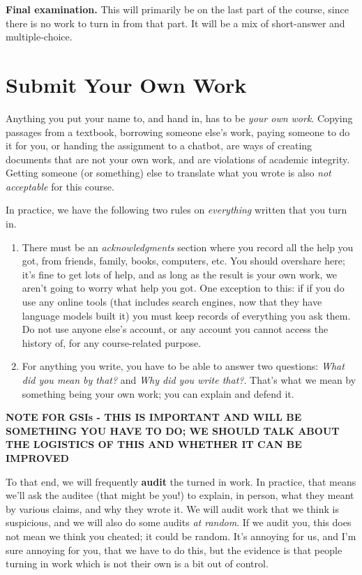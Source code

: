 \documentclass[
  letterpaper,
  DIV=11,
  numbers=noendperiod]{scrartcl}
\providecommand{\tightlist}{%
  \setlength{\itemsep}{0pt}\setlength{\parskip}{0pt}}
\begin{document}
\textbf{Final examination.} This will primarily be on the last part of
the course, since there is no work to turn in from that part. It will be
a mix of short-answer and multiple-choice.

\section{Submit Your Own Work}\label{submit-your-own-work}

Anything you put your name to, and hand in, has to be \emph{your own
work}. Copying passages from a textbook, borrowing someone else's work,
paying someone to do it for you, or handing the assignment to a chatbot,
are ways of creating documents that are not your own work, and are
violations of academic integrity. Getting someone (or something) else to
translate what you wrote is also \emph{not acceptable} for this course.

In practice, we have the following two rules on \emph{everything}
written that you turn in.

\begin{enumerate}
\def\labelenumi{\arabic{enumi}.}
\tightlist
\item
  There must be an \emph{acknowledgments} section where you record all
  the help you got, from friends, family, books, computers, etc. You
  should overshare here; it's fine to get lots of help, and as long as
  the result is your own work, we aren't going to worry what help you
  got. One exception to this: if if you do use any online tools (that
  includes search engines, now that they have language models built it)
  you must keep records of everything you ask them. Do not use anyone
  else's account, or any account you cannot access the history of, for
  any course-related purpose.
\item
  For anything you write, you have to be able to answer two questions:
  \emph{What did you mean by that?} and \emph{Why did you write that?}.
  That's what we mean by something being your own work; you can explain
  and defend it.
\end{enumerate}

\textbf{NOTE FOR GSIs - THIS IS IMPORTANT AND WILL BE SOMETHING YOU HAVE
TO DO; WE SHOULD TALK ABOUT THE LOGISTICS OF THIS AND WHETHER IT CAN BE
IMPROVED}

To that end, we will frequently \textbf{audit} the turned in work. In
practice, that means we'll ask the auditee (that might be you!) to
explain, in person, what they meant by various claims, and why they
wrote it. We will audit work that we think is suspicious, and we will
also do some audits \emph{at random}. If we audit you, this does not
mean we think you cheated; it could be random. It's annoying for us, and
I'm sure annoying for you, that we have to do this, but the evidence is
that people turning in work which is not their own is a bit out of
control.
\end{document}
